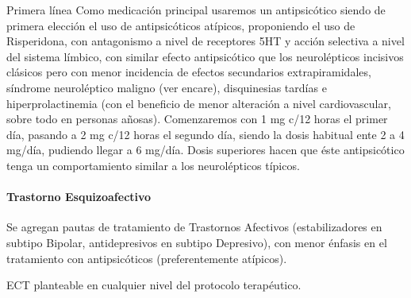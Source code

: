Primera línea Como medicación principal usaremos un antipsicótico siendo de primera elección el uso de antipsicóticos atípicos, proponiendo el uso de Risperidona, con antagonismo a nivel de receptores 5HT y acción selectiva a nivel del sistema límbico, con similar efecto antipsicótico que los neurolépticos incisivos clásicos pero con menor incidencia de efectos secundarios extrapiramidales, síndrome neuroléptico maligno (ver encare), disquinesias tardías e hiperprolactinemia (con el beneficio de menor alteración a nivel cardiovascular, sobre todo en personas añosas). Comenzaremos con 1 mg c/12 horas el primer día, pasando a 2 mg c/12 horas el segundo día, siendo la dosis habitual ente 2 a 4 mg/día, pudiendo llegar a 6 mg/día. Dosis superiores hacen que éste antipsicótico tenga un comportamiento similar a los neurolépticos típicos.

\paragraph{Trastorno Esquizoafectivo}
Se agregan pautas de tratamiento de Trastornos Afectivos (estabilizadores en subtipo Bipolar, antidepresivos en subtipo Depresivo), con menor énfasis en el tratamiento con antipsicóticos (preferentemente atípicos).

ECT planteable en cualquier nivel del protocolo terapéutico.


